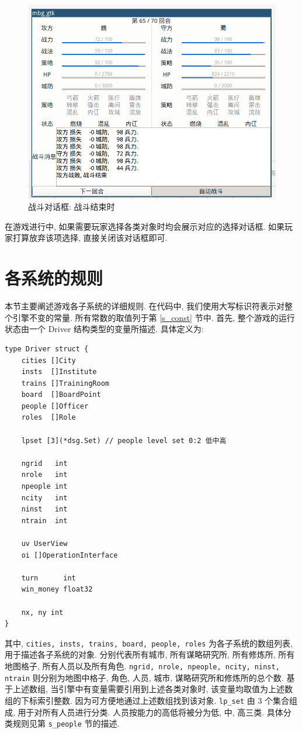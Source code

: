 \documentclass[UTF8, zihao=-4]{ctexart} %
\newcommand{\lcode}{\lstinline} % 段内插入代码
\begin{document}
\begin{figure}
    \centering
    \includegraphics[scale=0.4]{f_battle_res.png}
    \caption{\label{f_battle_res}战斗对话框: 战斗结束时}
\end{figure}

在游戏进行中, 如果需要玩家选择各类对象时均会展示对应的选择对话框.
如果玩家打算放弃该项选择, 直接关闭该对话框即可.

\section{各系统的规则}
\label{s_driver}
本节主要阐述游戏各子系统的详细规则. 在代码中, 我们使用大写标识符表示对整个引擎不变的常量.
所有常数的取值列于第 \ref{s_const} 节中.
首先, 整个游戏的运行状态由一个 Driver 结构类型的变量所描述. 具体定义为:
\begin{lstlisting}
type Driver struct {
	cities []City
	insts  []Institute
	trains []TrainingRoom
	board  []BoardPoint
	people []Officer
	roles  []Role

	lpset [3](*dsg.Set) // people level set 0:2 低中高

	ngrid   int
	nrole   int
	npeople int
	ncity   int
	ninst   int
	ntrain  int

	uv UserView
	oi []OperationInterface

	turn      int
	win_money float32

	nx, ny int
}
\end{lstlisting}
其中, \lcode{cities, insts, trains, board, people, roles} 为各子系统的数组列表, 用于描述各子系统的对象. 
分别代表所有城市, 所有谋略研究所, 所有修炼所, 所有地图格子, 所有人员以及所有角色.
\lcode{ngrid, nrole, npeople, ncity, ninst, ntrain} 则分别为地图中格子, 角色, 人员, 城市, 谋略研究所和修炼所的总个数.
基于上述数组, 当引擎中有变量需要引用到上述各类对象时, 该变量均取值为上述数组的下标索引整数. 因为可方便地通过上述数组找到该对象.
\lcode{lp_set} 由 $3$ 个集合组成, 用于对所有人员进行分类. 人员按能力的高低将被分为低, 中, 高三类.
具体分类规则见第 \lcode{s_people} 节的描述.
\end{document}
